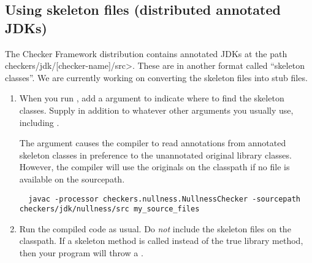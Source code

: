 
\subsection{Using skeleton files (distributed annotated JDKs)\label{skeleton-using}\label{skeleton}}

The Checker Framework distribution contains 
annotated JDKs at the path \<checkers/jdk/[checker-name]/src>.
These are in another format called
``skeleton classes''.  We are currently working on converting the skeleton
files into stub files.



\begin{enumerate}

\item
  When you run , add a  argument to indicate
  where to find the skeleton classes.
  Supply  in addition to whatever other arguments you
  usually use, including .

  The  argument causes the compiler to read annotations
  from annotated skeleton classes in preference to the unannotated original
  library classes.  However, the compiler will use the originals on the
  classpath if no file is available on the sourcepath.

\begin{smaller}
\begin{Verbatim}
  javac -processor checkers.nullness.NullnessChecker -sourcepath checkers/jdk/nullness/src my_source_files
\end{Verbatim}
\end{smaller}

\item
  Run the compiled code as usual.  Do \emph{not} include the skeleton files
  on the classpath.  If a skeleton method is called instead of the true
  library method, then your program will throw a .

\end{enumerate}



